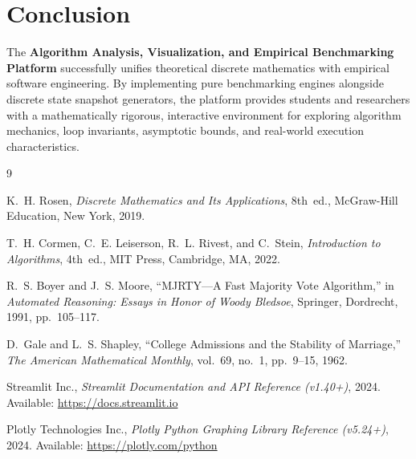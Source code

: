 \documentclass[11pt,a4paper]{article}
\theoremstyle{definition}
\theoremstyle{plain}
\theoremstyle{remark}
\begin{document}
\section{Conclusion}
The \textbf{Algorithm Analysis, Visualization, and Empirical Benchmarking Platform} successfully unifies theoretical discrete mathematics with empirical software engineering. By implementing pure benchmarking engines alongside discrete state snapshot generators, the platform provides students and researchers with a mathematically rigorous, interactive environment for exploring algorithm mechanics, loop invariants, asymptotic bounds, and real-world execution characteristics.

\begin{thebibliography}{9}

K.~H. Rosen,
\textit{Discrete Mathematics and Its Applications},
8th~ed., McGraw-Hill Education, New York, 2019.

T.~H. Cormen, C.~E. Leiserson, R.~L. Rivest, and C.~Stein,
\textit{Introduction to Algorithms},
4th~ed., MIT Press, Cambridge, MA, 2022.

R.~S. Boyer and J.~S. Moore,
``MJRTY---A Fast Majority Vote Algorithm,''
in \textit{Automated Reasoning: Essays in Honor of Woody Bledsoe},
Springer, Dordrecht, 1991, pp.~105--117.

D.~Gale and L.~S. Shapley,
``College Admissions and the Stability of Marriage,''
\textit{The American Mathematical Monthly},
vol.~69, no.~1, pp.~9--15, 1962.

Streamlit Inc.,
\textit{Streamlit Documentation and API Reference (v1.40+)},
2024. Available: \url{https://docs.streamlit.io}

Plotly Technologies Inc.,
\textit{Plotly Python Graphing Library Reference (v5.24+)},
2024. Available: \url{https://plotly.com/python}

\end{thebibliography}
\end{document}
